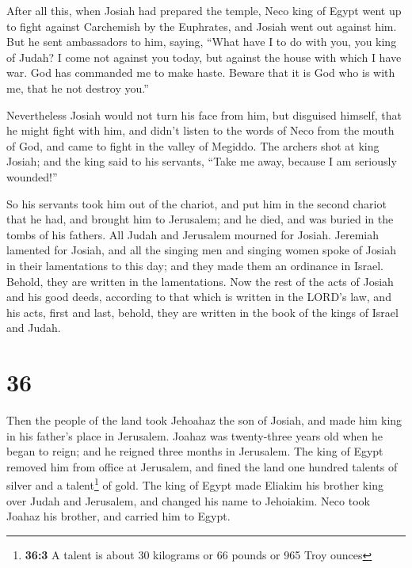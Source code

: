 After all this, when Josiah had prepared the temple,
Neco king of Egypt went up to fight against Carchemish by the Euphrates,
and Josiah went out against him.  But he sent ambassadors
to him, saying, ``What have I to do with you, you king of Judah? I come
not against you today, but against the house with which I have war. God
has commanded me to make haste. Beware that it is God who is with me,
that he not destroy you.''

 Nevertheless Josiah would not turn his face from him,
but disguised himself, that he might fight with him, and didn't listen
to the words of Neco from the mouth of God, and came to fight in the
valley of Megiddo.  The archers shot at king Josiah; and
the king said to his servants, ``Take me away, because I am seriously
wounded!''

 So his servants took him out of the chariot, and put him
in the second chariot that he had, and brought him to Jerusalem; and he
died, and was buried in the tombs of his fathers. All Judah and
Jerusalem mourned for Josiah.  Jeremiah lamented for
Josiah, and all the singing men and singing women spoke of Josiah in
their lamentations to this day; and they made them an ordinance in
Israel. Behold, they are written in the lamentations. 
Now the rest of the acts of Josiah and his good deeds, according to that
which is written in the LORD's law,  and his acts, first
and last, behold, they are written in the book of the kings of Israel
and Judah.

\hypertarget{section-35}{%
\section{36}\label{section-35}}

 Then the people of the land took Jehoahaz the son of
Josiah, and made him king in his father's place in Jerusalem.
 Joahaz was twenty-three years old when he began to reign;
and he reigned three months in Jerusalem.  The king of
Egypt removed him from office at Jerusalem, and fined the land one
hundred talents of silver and a talent\footnote{\textbf{36:3} A talent
  is about 30 kilograms or 66 pounds or 965 Troy ounces} of gold.
 The king of Egypt made Eliakim his brother king over
Judah and Jerusalem, and changed his name to Jehoiakim. Neco took Joahaz
his brother, and carried him to Egypt.

